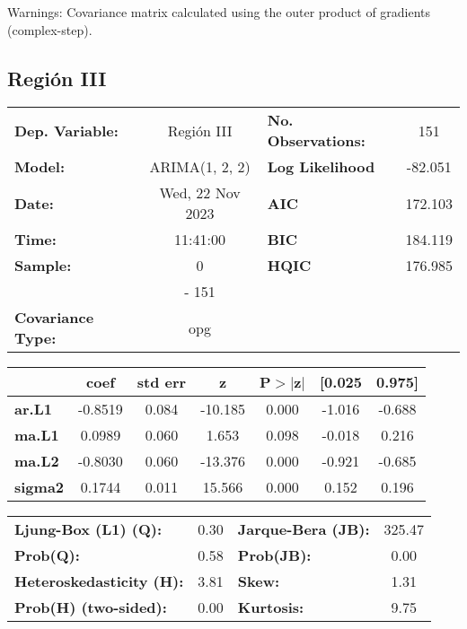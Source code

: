 \documentclass{article}%
\begin{document}
Warnings: \newline
 [1] Covariance matrix calculated using the outer product of gradients (complex-step).%
\subsection*{Región III}%
\begin{center}
\begin{tabular}{lclc}
\toprule
\textbf{Dep. Variable:}          &    Región III    & \textbf{  No. Observations:  } &    151      \\
\textbf{Model:}                  &  ARIMA(1, 2, 2)  & \textbf{  Log Likelihood     } &  -82.051    \\
\textbf{Date:}                   & Wed, 22 Nov 2023 & \textbf{  AIC                } &  172.103    \\
\textbf{Time:}                   &     11:41:00     & \textbf{  BIC                } &  184.119    \\
\textbf{Sample:}                 &        0         & \textbf{  HQIC               } &  176.985    \\
\textbf{}                        &       - 151      & \textbf{                     } &             \\
\textbf{Covariance Type:}        &       opg        & \textbf{                     } &             \\
\bottomrule
\end{tabular}
\begin{tabular}{lcccccc}
                & \textbf{coef} & \textbf{std err} & \textbf{z} & \textbf{P$> |$z$|$} & \textbf{[0.025} & \textbf{0.975]}  \\
\midrule
\textbf{ar.L1}  &      -0.8519  &        0.084     &   -10.185  &         0.000        &       -1.016    &       -0.688     \\
\textbf{ma.L1}  &       0.0989  &        0.060     &     1.653  &         0.098        &       -0.018    &        0.216     \\
\textbf{ma.L2}  &      -0.8030  &        0.060     &   -13.376  &         0.000        &       -0.921    &       -0.685     \\
\textbf{sigma2} &       0.1744  &        0.011     &    15.566  &         0.000        &        0.152    &        0.196     \\
\bottomrule
\end{tabular}
\begin{tabular}{lclc}
\textbf{Ljung-Box (L1) (Q):}     & 0.30 & \textbf{  Jarque-Bera (JB):  } & 325.47  \\
\textbf{Prob(Q):}                & 0.58 & \textbf{  Prob(JB):          } &  0.00   \\
\textbf{Heteroskedasticity (H):} & 3.81 & \textbf{  Skew:              } &  1.31   \\
\textbf{Prob(H) (two-sided):}    & 0.00 & \textbf{  Kurtosis:          } &  9.75   \\
\bottomrule
\end{tabular}
\end{center}
\end{document}
